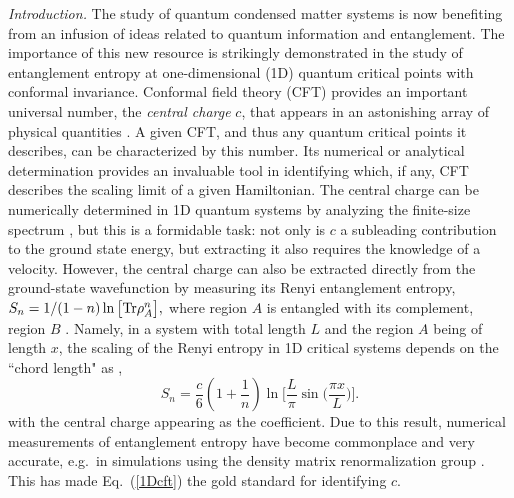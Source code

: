 \documentclass[prl,aps,twocolumn,floatfix,amsmath,amssymb,superscriptaddress,tightenlines]{revtex4}
\begin{document}
{\it Introduction.} 
The study of quantum condensed matter systems
 is now benefiting from an infusion of ideas related to quantum information and entanglement. The importance of this new resource is strikingly 
demonstrated in the study of entanglement entropy at one-dimensional (1D) quantum critical points with conformal invariance. Conformal field theory (CFT) provides an important
universal number, the {\it central charge} $c$, that appears in an astonishing array of physical
quantities \cite{Cardyubiquitous}. A given CFT, and
thus any quantum critical points it describes, can be
characterized by this number.
Its numerical or analytical determination provides an invaluable tool in identifying which, if any, CFT describes the scaling limit of a given Hamiltonian. 
The central charge can be numerically determined in 1D quantum systems by analyzing the finite-size spectrum \cite{BCN,Affleck}, but this is a formidable task: not only is $c$ a subleading contribution to the ground state energy, but extracting it also requires the knowledge of a velocity.
%
However,  the central charge can also be extracted 
directly from the ground-state wavefunction by measuring its Renyi
entanglement entropy, $ S_n = 1/(1-n) \ln \big[ {\rm Tr} \rho_A^n
\big], $ where region $A$ is entangled with its complement, region
$B$ \cite{Holzhey, VidalC}. Namely, in a system with total length $L$ and the region $A$ being of length $x$, the scaling of the Renyi entropy in 1D critical systems depends on the ``chord length" as \cite{Holzhey,Korepin,Cardy},
%
\begin{equation}
S_n = \frac{c}{6}\left({1+ \frac{1}{n} }\right) \ln\Big[ \frac{L}{\pi} \sin\big( \frac{\pi x}{L} \big) \Big]. \label{1Dcft}
\end{equation}
with the central charge appearing as the coefficient.
Due to this result, numerical measurements of entanglement entropy have become commonplace and 
very accurate, e.g.\ in simulations using the density matrix renormalization group \cite{White92,Scholl05}. This has made
Eq.~(\ref{1Dcft}) the gold standard for identifying $c$.
\end{document}
